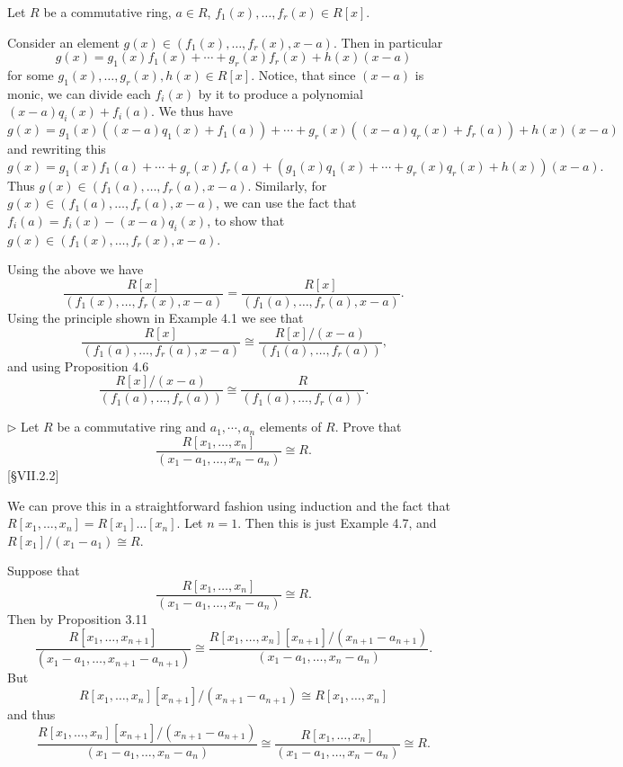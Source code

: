 \begin{solution}
	Let $R$ be a commutative ring, $a \in R$, $f_1(x), \dots, f_r(x) \in R[x]$.
	
	Consider an element $g(x) \in (f_1(x),\dots,f_r(x), x-a)$. Then in particular
	\[
		g(x) = g_1(x)f_1(x) + \cdots + g_r(x)f_r(x) + h(x)(x-a)
	\]
	for some $g_1(x), \dots, g_r(x), h(x) \in R[x]$. Notice, that since $(x-a)$ is monic, we can divide each $f_i(x)$ by it to produce a polynomial $(x-a)q_i(x) + f_i(a)$. We thus have
	\[
		g(x) = g_1(x)((x-a)q_1(x) + f_1(a)) + \cdots + g_r(x)((x-a)q_r(x) + f_r(a)) + h(x)(x-a)
	\]
	and rewriting this
	\[
		g(x) = g_1(x)f_1(a) + \cdots + g_r(x)f_r(a) + (g_1(x)q_1(x) + \cdots + g_r(x)q_r(x) + h(x))(x-a) \text{.}
	\]
	Thus $g(x) \in (f_1(a), \dots, f_r(a), x-a)$. Similarly, for $g(x) \in (f_1(a), \dots, f_r(a), x-a)$, we can use the fact that $f_i(a) = f_i(x) - (x-a)q_i(x)$, to show that $g(x) \in (f_1(x), \dots, f_r(x), x-a)$.
	
	Using the above we have
	\[
		\frac{R[x]}{(f_1(x), \dots, f_r(x), x-a)} = \frac{R[x]}{(f_1(a), \dots, f_r(a), x-a)} \text{.}
	\]
	Using the principle shown in Example 4.1 we see that
	\[
		\frac{R[x]}{(f_1(a), \dots, f_r(a), x-a)} \cong \frac{R[x]/(x-a)}{(f_1(a), \dots, f_r(a))} \text{,}
	\]
	and using Proposition 4.6
	\[
		\frac{R[x]/(x-a)}{(f_1(a), \dots, f_r(a))} \cong \frac{R}{(f_1(a), \dots, f_r(a))} \text{.}
	\]
\end{solution}

\begin{problem}
	$\triangleright$ Let $R$ be a commutative ring and $a_1, \cdots, a_n$ elements of $R$. Prove that
	\[
		\frac{R[x_1, \dots, x_n]}{(x_1 - a_1, \dots, x_n - a_n)} \cong R \text{.}
	\]
	[\S VII.2.2]
\end{problem}

\begin{solution}
	We can prove this in a straightforward fashion using induction and the fact that $R[x_1, \dots, x_n] = R[x_1]\dots[x_n]$. Let $n = 1$. Then this is just Example 4.7, and $R[x_1]/(x_1-a_1) \cong R$.
	
	Suppose that
	\[
		\frac{R[x_1, \dots, x_n]}{(x_1-a_1, \dots, x_n-a_n)} \cong R \text{.}
	\]
	Then by Proposition 3.11
	\[
		\frac{R[x_1, \dots, x_{n+1}]}{(x_1-a_1, \dots, x_{n+1}-a_{n+1})} \cong \frac{R[x_1, \dots, x_n][x_{n+1}]/(x_{n+1}-a_{n+1})}{(x_1-a_1, \dots, x_n-a_n)} \text{.}
	\]
	But
	\[
		R[x_1, \dots, x_n][x_{n+1}]/(x_{n+1}-a_{n+1}) \cong R[x_1, \dots, x_n]
	\]
	and thus
	\[
		\frac{R[x_1, \dots, x_n][x_{n+1}]/(x_{n+1}-a_{n+1})}{(x_1-a_1, \dots, x_n-a_n)} \cong \frac{R[x_1, \dots, x_n]}{(x_1-a_1, \dots, x_n-a_n)} \cong R \text{.}
	\]
\end{solution}

